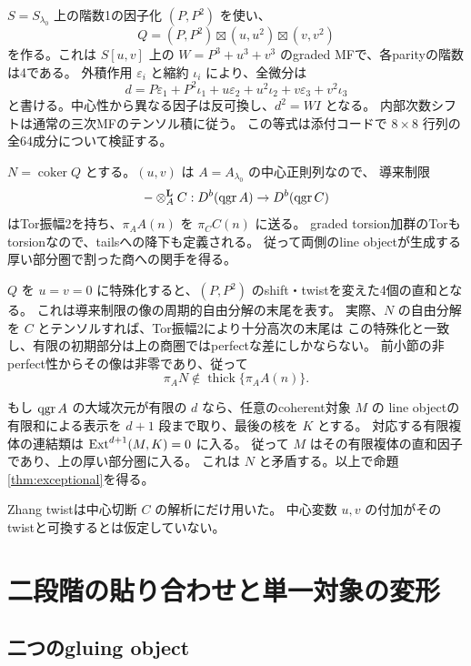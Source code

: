 $S=S_{\lambda_0}$ 上の階数1の因子化 $(P,P^2)$ を使い、
\[
 Q=(P,P^2)\boxtimes(u,u^2)\boxtimes(v,v^2)
\]
を作る。これは $S[u,v]$ 上の $W=P^3+u^3+v^3$ のgraded MFで、各parityの階数は4である。
外積作用 $\varepsilon_i$ と縮約 $\iota_i$ により、全微分は
\[
 d=P\varepsilon_1+P^2\iota_1+
 u\varepsilon_2+u^2\iota_2+v\varepsilon_3+v^2\iota_3
\]
と書ける。中心性から異なる因子は反可換し、$d^2=W I$ となる。
内部次数シフトは通常の三次MFのテンソル積に従う。
この等式は添付コードで $8\times8$ 行列の全64成分について検証する。

$N=\operatorname{coker}Q$ とする。$(u,v)$ は $A=A_{\lambda_0}$ の中心正則列なので、
導来制限
\[
 -\otimes_A^{\mathbf L}C:D^b(\operatorname{qgr} A)\to D^b(\operatorname{qgr} C)
\]
はTor振幅2を持ち、$\pi_AA(n)$ を $\pi_CC(n)$ に送る。
graded torsion加群のTorもtorsionなので、tailsへの降下も定義される。
従って両側のline objectが生成する厚い部分圏で割った商への関手を得る。

$Q$ を $u=v=0$ に特殊化すると、$(P,P^2)$ のshift・twistを変えた4個の直和となる。
これは導来制限の像の周期的自由分解の末尾を表す。
実際、$N$ の自由分解を $C$ とテンソルすれば、Tor振幅2により十分高次の末尾は
この特殊化と一致し、有限の初期部分は上の商圏ではperfectな差にしかならない。
前小節の非perfect性からその像は非零であり、従って
\[
 \pi_A N\notin\operatorname{thick}\{\pi_AA(n)\}.
\]

もし $\operatorname{qgr} A$ の大域次元が有限の $d$ なら、任意のcoherent対象 $M$ の
line objectの有限和による表示を $d+1$ 段まで取り、最後の核を $K$ とする。
対応する有限複体の連結類は $\operatorname{Ext}^{d+1}(M,K)=0$ に入る。
従って $M$ はその有限複体の直和因子であり、上の厚い部分圏に入る。
これは $N$ と矛盾する。以上で命題\ref{thm:exceptional}を得る。

Zhang twistは中心切断 $C$ の解析にだけ用いた。
中心変数 $u,v$ の付加がそのtwistと可換するとは仮定していない。

\section{二段階の貼り合わせと単一対象の変形}\label{sec:gluing-objects}

\subsection{二つのgluing object}

